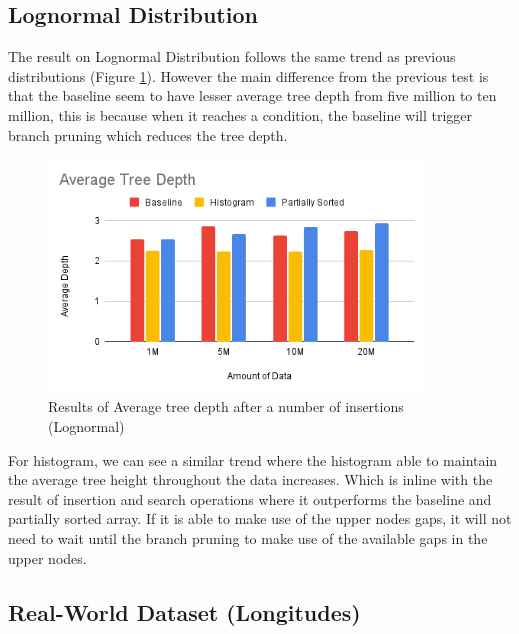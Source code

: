 \subsection{Lognormal Distribution}
The result on Lognormal Distribution follows the same trend as previous distributions (Figure \ref{fig:AverageTreeDepthLog}). However the main difference from the previous test is that the baseline seem to have lesser average tree depth from five million to ten million, this is because when it reaches a condition, the baseline will trigger branch pruning which reduces the tree depth. 
\begin{figure}[H]
    \centering
    \includegraphics[width=100mm,scale=1]{Figures/AVGTD-Log.png}
    \caption{
     Results of Average tree depth after a number of insertions (Lognormal)
    }
    \label{fig:AverageTreeDepthLog}
\end{figure}

For histogram, we can see a similar trend where the histogram able to maintain the average tree height throughout the data increases. Which is inline with the result of insertion and search operations where it outperforms the baseline and partially sorted array. If it is able to make use of the upper nodes gaps, it will not need to wait until the branch pruning to make use of the available gaps in the upper nodes. 

\subsection{Real-World Dataset (Longitudes)}

